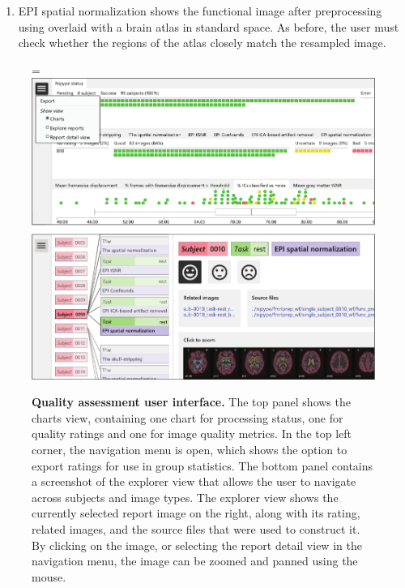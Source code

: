\begin{enumerate}
\item

EPI spatial normalization shows the functional image after preprocessing using  overlaid with a brain atlas in standard space. As before, the user must check whether the regions of the atlas closely match the resampled image.

\end{enumerate}

\begin{figure}[!tb]
    \begin{adjustwidth}{-1cm}{}
        \hsize=\linewidth%
        \includegraphics[width=\linewidth]{./fig/quality-assessment/quality-assessment-crop.pdf}
        \caption{\textbf{Quality assessment user interface.} The top panel shows the charts view, containing one chart for processing status, one for quality ratings and one for image quality metrics. In the top left corner, the navigation menu is open, which shows the option to export ratings for use in group statistics. The bottom panel contains a screenshot of the explorer view that allows the user to navigate across subjects and image types. The explorer view shows the currently selected report image on the right, along with its rating, related images, and the source files that were used to construct it. By clicking on the image, or selecting the report detail view in the navigation menu, the image can be zoomed and panned using the mouse.}\label{fig:qa}
    \end{adjustwidth}
\end{figure}

